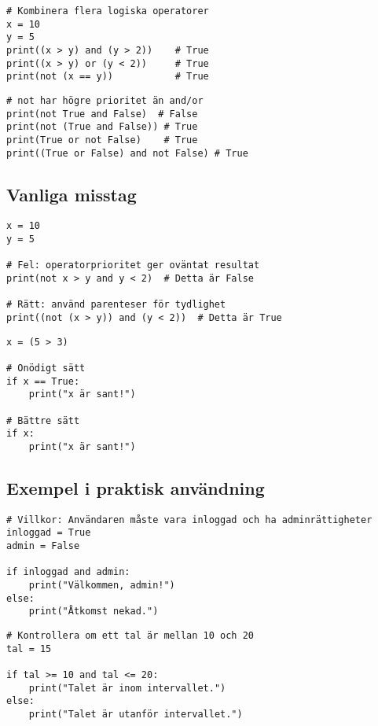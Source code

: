 \begin{lstlisting}[title=Exempel 6: Kombinera and\, or och not]
# Kombinera flera logiska operatorer
x = 10
y = 5
print((x > y) and (y > 2))    # True
print((x > y) or (y < 2))     # True
print(not (x == y))           # True
\end{lstlisting}

\begin{lstlisting}[title=Exempel 7: Operatorns prioritet]
# not har högre prioritet än and/or
print(not True and False)  # False
print(not (True and False)) # True
print(True or not False)    # True
print((True or False) and not False) # True
\end{lstlisting}

\subsection*{Vanliga misstag}

\begin{lstlisting}[title=Exempel 8: Glöm inte parenteser vid komplexa uttryck]
x = 10
y = 5

# Fel: operatorprioritet ger oväntat resultat
print(not x > y and y < 2)  # Detta är False

# Rätt: använd parenteser för tydlighet
print((not (x > y)) and (y < 2))  # Detta är True
\end{lstlisting}

\begin{lstlisting}[title=Exempel 9: Jämför inte direkt med \texttt{True}/\texttt{False}]
x = (5 > 3)

# Onödigt sätt
if x == True:
    print("x är sant!")

# Bättre sätt
if x:
    print("x är sant!")
\end{lstlisting}

\subsection*{Exempel i praktisk användning}

\begin{lstlisting}[title=Exempel 10: Kontrollera tillgång till system]
# Villkor: Användaren måste vara inloggad och ha adminrättigheter
inloggad = True
admin = False

if inloggad and admin:
    print("Välkommen, admin!")
else:
    print("Åtkomst nekad.")
\end{lstlisting}

\begin{lstlisting}[title=Exempel 11: Kontrollera om ett tal är i intervall]
# Kontrollera om ett tal är mellan 10 och 20
tal = 15

if tal >= 10 and tal <= 20:
    print("Talet är inom intervallet.")
else:
    print("Talet är utanför intervallet.")
\end{lstlisting}
